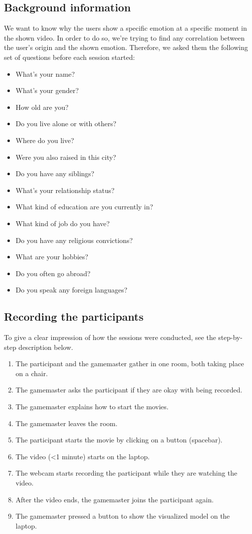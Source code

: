 \documentclass[sigconf]{acmart}
\begin{document}
\subsection{Background information}
We want to know why the users show a specific emotion at a specific moment in the shown video. In order to
do so, we're trying to find any correlation between the user's origin and the shown emotion. Therefore,
we asked them the following set of questions before each session started:
\begin{itemize}
    \item{What's your name?}
    \item{What's your gender?}
    \item{How old are you?}
    \item{Do you live alone or with others?}
    \item{Where do you live?}
    \item{Were you also raised in this city?}
    \item{Do you have any siblings?}
    \item{What's your relationship status?}
    \item{What kind of education are you currently in?}
    \item{What kind of job do you have?}
    \item{Do you have any religious convictions?}
    \item{What are your hobbies?}
    \item{Do you often go abroad?}
    \item{Do you speak any foreign languages?}
\end{itemize}

\subsection{Recording the participants}
To give a clear impression of how the sessions were conducted, see the step-by-step description below.
\begin{enumerate}
    \item{The participant and the gamemaster gather in one room, both taking place on a chair.}
    \item{The gamemaster asks the participant if they are okay with being recorded.}
    \item{The gamemaster explains how to start the movies.}
    \item{The gamemaster leaves the room.}
    \item{The participant starts the movie by clicking on a button (spacebar).}
    \item{The video (<1 minute) starts on the laptop.}
    \item{The webcam starts recording the participant while they are watching the video.}
    \item{After the video ends, the gamemaster joins the participant again.}
    \item{The gamemaster pressed a button to show the visualized model on the laptop.}
\end{enumerate}
\end{document}

